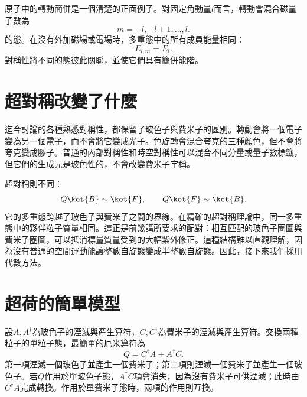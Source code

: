 原子中的轉動簡併是一個清楚的正面例子。對固定角動量\(l\)而言，轉動會混合磁量子數為
\begin{equation}
m=-l,-l+1,\ldots,l.
\end{equation}
的態。在沒有外加磁場或電場時，多重態中的所有成員能量相同：
\begin{equation}
E_{l,m}=E_l.
\end{equation}
對稱性將不同的態彼此關聯，並使它們具有簡併能階。

\section{超對稱改變了什麼}

迄今討論的各種熟悉對稱性，都保留了玻色子與費米子的區別。轉動會將一個電子變為另一個電子，而不會將它變成光子。色旋轉會混合夸克的三種顏色，但不會將夸克變成膠子。普通的內部對稱性和時空對稱性可以混合不同分量或量子數標籤，但它們的生成元是玻色性的，不會改變費米子宇稱。

超對稱則不同：
\begin{equation}
Q\ket{B}\sim\ket{F},
\qquad
Q\ket{F}\sim\ket{B}.
\end{equation}
它的多重態跨越了玻色子與費米子之間的界線。在精確的超對稱理論中，同一多重態中的夥伴粒子質量相同。這正是前幾講所要求的配對：相互匹配的玻色子圈圖與費米子圈圖，可以抵消標量質量受到的大幅紫外修正。這種結構難以直觀理解，因為沒有普通的空間運動能讓整數自旋態變成半整數自旋態。因此，接下來我們採用代數方法。

\section{超荷的簡單模型}

設\(A,A^\dagger\)為玻色子的湮滅與產生算符，\(C,C^\dagger\)為費米子的湮滅與產生算符。交換兩種粒子的單粒子態，最簡單的厄米算符為
\begin{equation}
Q=C^\dagger A+A^\dagger C.
\end{equation}
第一項湮滅一個玻色子並產生一個費米子；第二項則湮滅一個費米子並產生一個玻色子。若\(Q\)作用於單玻色子態，\(A^\dagger C\)項會消失，因為沒有費米子可供湮滅；此時由\(C^\dagger A\)完成轉換。作用於單費米子態時，兩項的作用則互換。

\begin{classroomqa}
\end{classroomqa}

